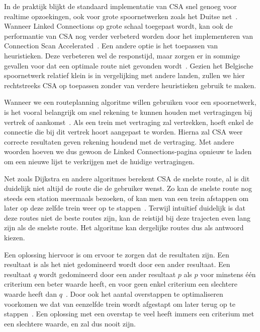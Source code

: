In de praktijk blijkt de standaard implementatie van CSA snel genoeg voor realtime opzoekingen, ook voor grote spoornetwerken zoals het Duitse net~\citep{strasser14}. Wanneer Linked Connections op grote schaal toegepast wordt, kan ook de performantie van CSA nog verder verbeterd worden door het implementeren van Connection Scan Accelerated~\citep{strasser14,strasser17}. Een andere optie is het toepassen van heuristieken. Deze verbeteren wel de responstijd, maar zorgen er in sommige gevallen voor dat een optimale route niet gevonden wordt~\citep{hannemann07}. Gezien het Belgische spoornetwerk relatief klein is in vergelijking met andere landen, zullen we hier rechtstreeks CSA op toepassen zonder van verdere heuristieken gebruik te maken. 

Wanneer we een routeplanning algoritme willen gebruiken voor een spoornetwerk, is het vooral belangrijk om snel rekening te kunnen houden met vertragingen bij vertrek of aankomst~\citep{strasser14,strasser17}. Als een trein met vertraging zal vertrekken, hoeft enkel de connectie die bij dit vertrek hoort aangepast te worden. Hierna zal CSA weer correcte resultaten geven rekening houdend met de vertraging. Met andere woorden hoeven we dus gewoon de Linked Connections-pagina opnieuw te laden om een nieuwe lijst te verkrijgen met de huidige vertragingen. 

Net zoals Dijkstra en andere algoritmes berekent CSA de snelste route, al is dit duidelijk niet altijd de route die de gebruiker wenst. Zo kan de snelste route nog steeds een station meermaals bezoeken, of kan men van een trein afstappen om later op deze zelfde trein weer op te stappen~\citep{strasser14}. Terwijl intuïtief duidelijk is dat deze routes niet de beste routes zijn, kan de reistijd bij deze trajecten even lang zijn als de snelste route. Het algoritme kan dergelijke routes dus als antwoord kiezen.

Een oplossing hiervoor is om ervoor te zorgen dat de resultaten  zijn. Een resultaat is  als het niet gedomineerd wordt door een ander resultaat. Een resultaat $q$ wordt gedomineerd door een ander resultaat $p$ als $p$ voor minstens één criterium een beter waarde heeft, en voor geen enkel criterium een slechtere waarde heeft dan $q$~\citep{hannemann08,strasser17}. Door ook het aantal overstappen te optimaliseren voorkomen we dat van eenzelfde trein wordt afgestapt om later terug op te stappen~\citep{strasser14}. Een oplossing met een overstap te veel heeft immers een criterium met een slechtere waarde, en zal dus nooit  zijn.


